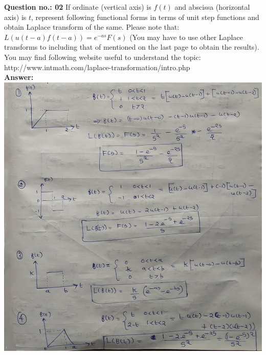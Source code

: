 \documentclass[a4paper,12pt]{report}
\begin{document}
\noindent
\textbf{Question no.: 02} If ordinate (vertical axis) is $f(t)$ and abscissa (horizontal axis) is $t$, represent following functional forms in terms of unit step functions and obtain Laplace transform of the same. Please note that: $L(u(t -a)f(t -a))=e^{-as}F(s)$ (You may have to use other Laplace transforms to including that of mentioned on the last page to obtain the results). You may find following website useful to understand the topic:
http://www.intmath.com/laplace-transformation/intro.php\\[2mm]
\textbf{Answer:} \\[1 cm]
\includegraphics[scale=0.3]{CF_Assignment02_1.jpg}
%

%
\end{document}
